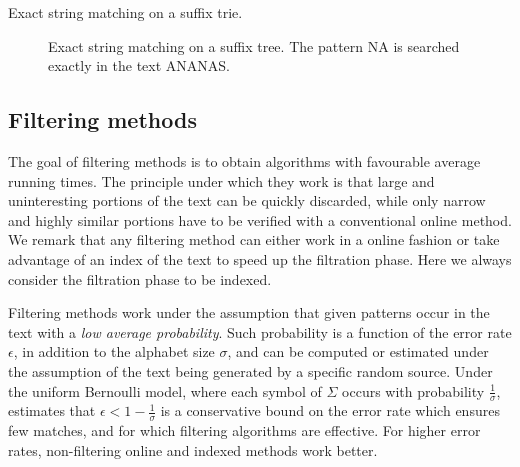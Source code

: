 \begin{algorithm}[h]
\caption{Exact string matching on a suffix trie.}
\label{alg:st-exact}
\begin{algorithmic}[1]
		\State \Report {}
			\State {}
	\EndIf
\EndProcedure
\end{algorithmic}
\end{algorithm}

\begin{figure}[h]
\begin{center}
\caption[Exact string matching on a suffix tree.]{Exact string matching on a suffix tree. The pattern NA is searched exactly in the text ANANAS.}
\label{fig:st-exact}

\end{center}
\end{figure}



\subsection{Filtering methods}
\label{sec:intro:filtering}

The goal of filtering methods is to obtain algorithms with favourable average running times.
The principle under which they work is that large and uninteresting portions of the text can be quickly discarded, while only narrow and highly similar portions have to be verified with a conventional online method.
We remark that any filtering method can either work in a online fashion or take advantage of an index of the text to speed up the filtration phase.
Here we always consider the filtration phase to be indexed.

Filtering methods work under the assumption that given patterns occur in the text with a \emph{low average probability}.
Such probability is a function of the error rate $\epsilon$, in addition to the alphabet size $\sigma$, and can be computed or estimated under the assumption of the text being generated by a specific random source.
Under the uniform Bernoulli model, where each symbol of $\Sigma$ occurs with probability $\frac{1}{\sigma}$, \citet{Navarro2000} estimates that $\epsilon < 1 - \frac{1}{\sigma}$ is a conservative bound on the error rate which ensures few matches, and for which filtering algorithms are effective.
For higher error rates, non-filtering online and indexed methods work better.

